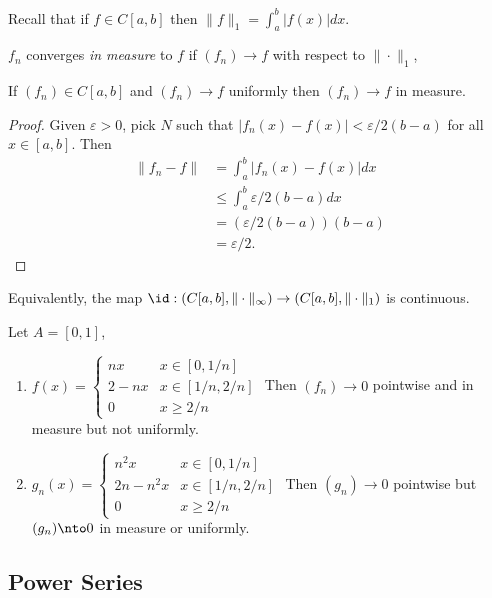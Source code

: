 \documentclass[a4paper]{article}
\theoremstyle{definition}
\begin{document}
Recall that if \(f\in C[a,b]\) then \(\|f\|_1=\int_a^b|f(x)|dx\). 
\begin{defi}
  \(f_n\) converges \emph{in measure} to \(f\) if \((f_n)\to f\) with respect to \(\|\cdot\|_1\), 
\end{defi}

\begin{lem}
  If \((f_n)\in C[a,b]\) and \((f_n)\to f\) uniformly then \((f_n)\to f\) in measure.
\end{lem}

\begin{proof}
  Given \(\varepsilon>0\), pick \(N\) such that \(|f_n(x)-f(x)|<\varepsilon/2(b-a)\) for all \(x\in [a,b]\). Then
  \begin{align*}
    \|f_n-f\| &= \int_a^b |f_n(x)-f(x)| dx \\
              &\leq \int_a^b\varepsilon/2(b-a) dx \\
              &= (\varepsilon/2(b-a))(b-a) \\
              &= \varepsilon/2.
\end{align*}
\end{proof}

Equivalently, the map \(\id: (C[a,b], \|\cdot\|_\infty)\to (C[a,b], \|\cdot\|_1)\) is continuous.

\begin{eg}
  Let \(A=[0,1]\),
  \begin{enumerate}
  \item \(f(x) =
      \begin{cases}
        nx & x\in [0,1/n] \\ 2-nx & x\in [1/n,2/n] \\0 & x\geq2/n
      \end{cases}
  \)
  Then \((f_n)\to 0\) pointwise and in measure but not uniformly.
\item \(g_n(x) =
    \begin{cases}
      n^2 x & x\in [0,1/n]\\
      2n-n^2 x& x\in[1/n, 2/n] \\
      0 & x \geq 2/n
    \end{cases}
  \)
  Then \((g_n)\to 0\) pointwise but \((g_n)\nto 0\) in measure or uniformly.
  \end{enumerate}
\end{eg}

\subsection{Power Series}
\end{document}
